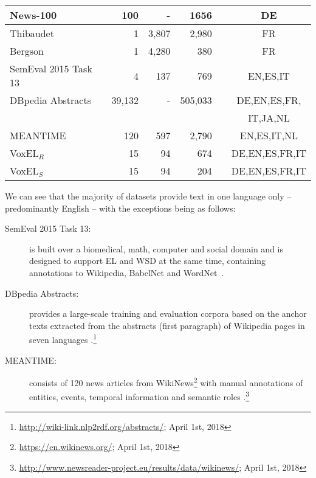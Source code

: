 \documentclass{llncs}
\newcommand{\cmark}{\ding{51}}%
\newcommand{\xmark}{\ding{55}}%
\begin{document}
\begin{table}[tb!]
\begin{tabular}{lrrrcc}
News-100~\cite{n3}                  &100     &-      &1656    &\cmark  &DE \\\midrule
Thibaudet~\cite{renden2016}         &1       &3,807  &2,980   &\xmark  &FR \\\midrule
Bergson~\cite{renden2016}           &1       &4,280  &380     &\xmark  &FR \\\midrule
SemEval 2015 
Task 13~\cite{moro2015semeval}      &4       &137    &769     &\cmark &EN,ES,IT \\ \midrule
DBpedia Abstracts
~\cite{abstracts2016}               &39,132  &-      &505,033 &\xmark &DE,EN,ES,FR, \\
                                    &        &       &        &       &IT,JA,NL \\\midrule
MEANTIME \cite{meantime2016}        &120     &597    &2,790   &\xmark &EN,ES,IT,NL \\\midrule 
VoxEL$_R$                           &15      &94     &674     &\cmark &DE,EN,ES,FR,IT\\\midrule  
VoxEL$_S$                           &15      &94     &204     &\cmark &DE,EN,ES,FR,IT\\ 
\bottomrule
\end{tabular}
\end{table}

We can see that the majority of datasets provide text in one language only -- predominantly English -- with the exceptions being as follows: 

\begin{description}
\item[SemEval 2015 Task 13:] is built over a biomedical, math, computer and social domain and is designed to support EL and WSD at the same time, containing annotations to Wikipedia, BabelNet and WordNet~\cite{moro2015semeval}.
\item[DBpedia Abstracts:] provides a large-scale training and evaluation corpora based on the anchor texts extracted from the abstracts (first paragraph) of Wikipedia pages in seven languages \cite{abstracts2016}.\footnote{\url{http://wiki-link.nlp2rdf.org/abstracts/}; April 1st, 2018} 
\item[MEANTIME:] consists of 120 news articles from WikiNews\footnote{\url{https://en.wikinews.org/}; April 1st, 2018} with manual annotations of entities, events, temporal information and semantic roles \cite{meantime2016}.\footnote{\url{http://www.newsreader-project.eu/results/data/wikinews/}; April 1st, 2018} 
\end{description}
\end{document}
